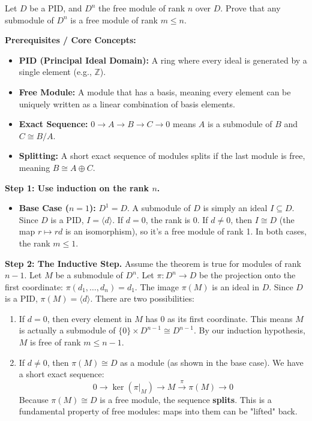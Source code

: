 \begin{exercise}
\label{algebra:2011:8}
Let $D$ be a PID, and $D^n$ the free module of rank $n$ over $D$. Prove that any submodule of $D^n$ is a free module of rank $m \leq n$.
\end{exercise}

\begin{solution}
\textbf{Prerequisites / Core Concepts:}
\begin{itemize}
    \item \textbf{PID (Principal Ideal Domain):} A ring where every ideal is generated by a single element (e.g., $\mathbb{Z}$).
    \item \textbf{Free Module:} A module that has a basis, meaning every element can be uniquely written as a linear combination of basis elements.
    \item \textbf{Exact Sequence:} $0 \to A \to B \to C \to 0$ means $A$ is a submodule of $B$ and $C \cong B/A$.
    \item \textbf{Splitting:} A short exact sequence of modules splits if the last module is free, meaning $B \cong A \oplus C$.
\end{itemize}

\textbf{Step 1: Use induction on the rank $n$.}
\begin{itemize}
    \item \textbf{Base Case ($n=1$):} $D^1 = D$. A submodule of $D$ is simply an ideal $I \subseteq D$. Since $D$ is a PID, $I = \langle d \rangle$. If $d=0$, the rank is 0. If $d \neq 0$, then $I \cong D$ (the map $r \mapsto rd$ is an isomorphism), so it's a free module of rank 1. In both cases, the rank $m \leq 1$.
\end{itemize}

\textbf{Step 2: The Inductive Step.}
Assume the theorem is true for modules of rank $n-1$. Let $M$ be a submodule of $D^n$.
Let $\pi: D^n \to D$ be the projection onto the first coordinate: $\pi(d_1, \dots, d_n) = d_1$.
The image $\pi(M)$ is an ideal in $D$. Since $D$ is a PID, $\pi(M) = \langle d \rangle$.
There are two possibilities:
\begin{enumerate}
    \item If $d = 0$, then every element in $M$ has 0 as its first coordinate. This means $M$ is actually a submodule of $\{0\} \times D^{n-1} \cong D^{n-1}$. By our induction hypothesis, $M$ is free of rank $m \leq n-1$.
    \item If $d \neq 0$, then $\pi(M) \cong D$ as a module (as shown in the base case). We have a short exact sequence:
    \[ 0 \to \ker(\pi|_M) \to M \xrightarrow{\pi} \pi(M) \to 0 \]
    Because $\pi(M) \cong D$ is a free module, the sequence \textbf{splits}. This is a fundamental property of free modules: maps into them can be "lifted" back.
\end{enumerate}


\end{solution}
